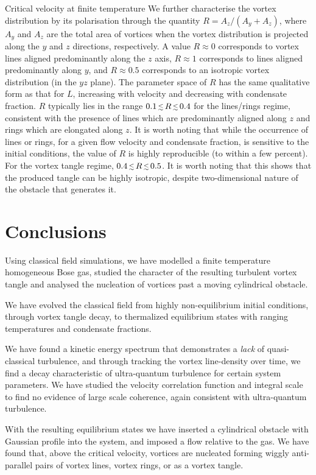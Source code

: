 \begin{chapter}{\label{cha:nonequib}Critical velocity at finite temperature}
We further characterise the vortex distribution by its polarisation through the quantity $R=A_z/(A_y+A_z)$, where $A_y$ and $A_z$ are the total area of vortices when the vortex distribution is projected along the $y$ and $z$ directions, respectively.  A value $R \approx 0$ corresponds to vortex lines aligned predominantly along the $z$ axis, $R\approx 1$ corresponds to lines aligned predominantly along $y$, and $R\approx 0.5$ corresponds to an isotropic vortex distribution (in the $yz$ plane).  The parameter space of $R$ has the same qualitative form as that for $L$, increasing with velocity and decreasing with condensate fraction. $R$ typically lies in the range $0.1 \,\mbox{\footnotesize$\lesssim$}\, R\,\mbox{\footnotesize$\lesssim$}\, 0.4$ for the lines/rings regime, consistent with the presence of lines which are predominantly aligned along $z$ and rings which are elongated along $z$.  It is worth noting that while the occurrence of lines or rings, for a given flow velocity and condensate fraction, is sensitive to the initial conditions, the value of $R$ is highly reproducible (to within a few percent).       For the vortex tangle regime, $0.4 \,\mbox{\footnotesize$\lesssim$}\, R\,\mbox{\footnotesize$\lesssim$}\, 0.5$.  It is worth noting that this shows that the produced tangle can be highly isotropic, despite two-dimensional nature of the obstacle that generates it.

\section{Conclusions\label{sec:conclusions}}

Using classical field simulations, we have modelled a finite temperature homogeneous Bose gas, 
studied the character of the resulting turbulent vortex tangle and analysed the nucleation
of vortices past a moving cylindrical obstacle.

We have evolved the classical field
from highly non-equilibrium initial conditions, through vortex tangle decay, to thermalized equilibrium
states with ranging temperatures and condensate fractions.

We have found a kinetic energy spectrum that demonstrates a {\it lack} of quasi-classical turbulence, and through tracking the vortex line-density over time, we find a decay characteristic of ultra-quantum turbulence for certain system parameters. We have studied the velocity correlation function and integral scale to find no evidence of large scale coherence, again consistent with ultra-quantum turbulence.

With the resulting equilibrium states we have inserted a cylindrical obstacle with Gaussian profile into the system, and imposed a flow relative to the gas.  We have found that, above the critical velocity, vortices are nucleated forming wiggly anti-parallel pairs of vortex lines, vortex rings, or as a vortex tangle.


\end{chapter}
